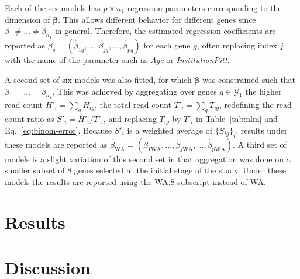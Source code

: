 \documentclass[letterpaper]{article}
\begin{document}
Each of the six models has \(p\times n_1\) regression parameters corresponding to the
dimension of \(\boldsymbol{\beta}\).  This allows different behavior for
different genes since \(\beta_1\neq ...\neq\beta_{n_1}\) in general.
Therefore, the estimated regression coefficients are reported as \(\hat{\beta}_g =
(\hat{\beta}_{1g},...,\hat{\beta}_{jg},...,\hat{\beta}_{pg})\) for each gene \(g\), often
replacing index \(j\) with the name of the parameter such as \emph{Age} or
\emph{InstitutionPitt}.

A second set of six models was also
fitted, for which \(\boldsymbol{\beta}\) was constrained such that \(\beta_1 =
... = \beta_{n_1}\).  This was achieved by aggregating over genes
\(g\in\mathcal{G}_1\) the higher read count \(H'_i = \sum_g H_{ig}\), the
total read count \(T'_i = \sum_g T_{ig}\), redefining the read count ratio
as \(S'_i = H'_i / T'_i\), and replacing \(T_{ig}\) by \(T'_i\) in
Table~\ref{tab:nlm} and Eq.~\ref{eq:binom-error}.  Because \(S'_i\) is a
weighted average of \(\{S_{ig}\}_i\), results under these models are reported
as \(\hat{\beta}_\mathrm{WA} =
(\hat{\beta}_{1\mathrm{WA}},...,\hat{\beta}_{j\mathrm{WA}},...,\hat{\beta}_{p\mathrm{WA}})\).  A
third set of models is a slight variation of this second set in that
aggregation was done on a smaller subset of 8 genes selected at the initial
stage of the study.  Under these models the results are reported using the
WA.8 subscript instead of WA.

\section{Results}

\section{Discussion}
\end{document}
